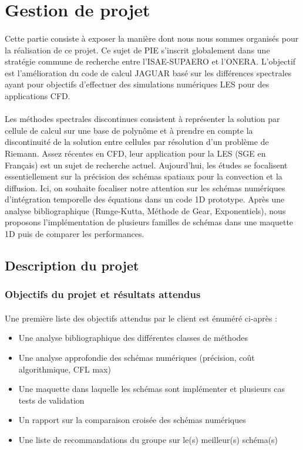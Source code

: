 \section{Gestion de projet}

\paragraph{}
Cette partie consiste à exposer la manière dont nous nous sommes organisés pour la réalisation de ce projet. Ce sujet de PIE s'inscrit globalement dans une stratégie commune de recherche entre l'ISAE-SUPAERO et l'ONERA. L'objectif est l'amélioration du code de calcul JAGUAR basé sur les différences spectrales ayant pour objectifs d'effectuer des simulations numériques LES pour des applications CFD.

\paragraph{}
Les méthodes spectrales discontinues consistent à représenter la solution par cellule de calcul sur une base de polynôme et à prendre en compte la discontinuité de la solution entre cellules par résolution d'un problème de Riemann. Assez récentes en CFD, leur application pour la LES (SGE en Français) est un sujet de recherche actuel. Aujourd'hui, les études se focalisent essentiellement sur la précision des schémas spatiaux pour la convection et la diffusion. Ici, on souhaite focaliser notre attention sur les schémas numériques d'intégration temporelle des équations dans un code 1D prototype. Après une analyse bibliographique (Runge‐Kutta, Méthode de Gear, Exponentiels), nous proposons l'implémentation de plusieurs familles de schémas dans une maquette 1D puis de comparer les performances.

\subsection{Description du projet}

    \subsubsection{Objectifs du projet et résultats attendus}
    \paragraph{}
Une première liste des objectifs attendus par le client est énuméré ci-après :   
    \begin{itemize}
    	\item Une analyse bibliographique des différentes classes de méthodes
    	\item Une analyse approfondie des schémas numériques (précision, coût algorithmique, CFL max) 
    	\item Une maquette dans laquelle les schémas sont implémenter et plusieurs cas tests de validation 
    	\item Un rapport sur la comparaison croisée des schémas numériques
    	\item Une liste de recommandations du groupe sur le(s) meilleur(s) schéma(s)
    \end{itemize}
    
